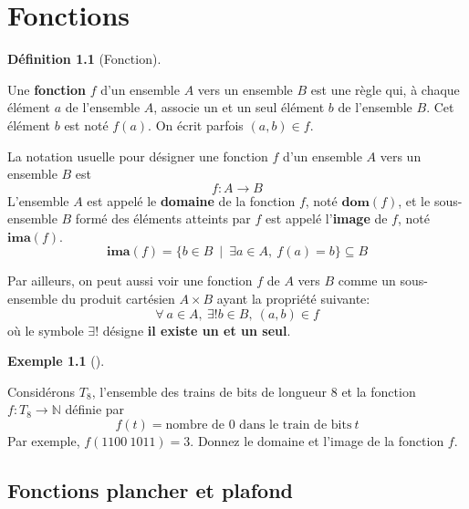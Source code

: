 \documentclass[
  letterpaper,
]{scrbook}
\newcommand{\set}[1]{\{#1\}}
\theoremstyle{plain}
\theoremstyle{definition}
\newtheorem{example}{Exemple}[chapter]
\theoremstyle{definition}
\newtheorem{definition}{Définition}[chapter]
\theoremstyle{remark}
\begin{document}

\hypertarget{fonctions}{%
\chapter{Fonctions}\label{fonctions}}

\leavevmode{}%
\begin{definition}[Fonction]\label{def-fonction}

Une \textbf{fonction} \(f\) d'un ensemble \(A\) vers un ensemble \(B\)
est une règle qui, à chaque élément \(a\) de l'ensemble \(A\), associe
un et un seul élément \(b\) de l'ensemble \(B\). Cet élément \(b\) est
noté \(f(a)\). On écrit parfois \((a,b)\in f\).

La notation usuelle pour désigner une fonction \(f\) d'un ensemble \(A\)
vers un ensemble \(B\) est \[
f:A\rightarrow B
\] L'ensemble \(A\) est appelé le \textbf{domaine} de la fonction \(f\),
noté \(\mathbf{dom} (f)\), et le sous-ensemble \(B\) formé des éléments
atteints par \(f\) est appelé l'\textbf{image} de \(f\), noté
\(\mathbf{ima} (f)\). \[
\mathbf{ima} (f) = \set{b\in B\ \mid\ \exists a\in A,\ f(a)=b} \subseteq B
\]

\end{definition}

Par ailleurs, on peut aussi voir une fonction \(f\) de \(A\) vers \(B\)
comme un sous-ensemble du produit cartésien \(A\times B\) ayant la
propriété suivante: \[
\forall\ a\in A,\ \exists !b\in B,\ (a,b)\in f
\] où le symbole \(\exists !\) désigne \textbf{il existe un et un seul}.

\leavevmode{}%
\begin{example}[]\label{exm-fonction-trains-bits-longueur-8}

Considérons \(T_8\), l'ensemble des trains de bits de longueur 8 et la
fonction \(f:T_8\rightarrow \mathbb{N}\) définie par \[
f(t)=\text{nombre de 0 dans le train de bits}\ t
\] Par exemple, \(f(1100\ 1011)=3\). Donnez le domaine et l'image de la
fonction \(f\).

\end{example}

\hypertarget{fonctions-plancher-et-plafond}{%
\section{Fonctions plancher et
plafond}\label{fonctions-plancher-et-plafond}}
\end{document}

